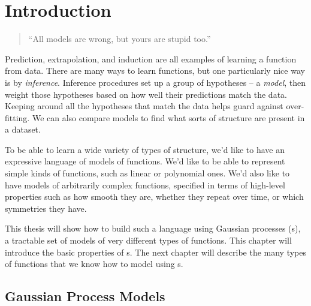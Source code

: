 
\inbpdocument

\chapter{Introduction}
\label{ch:intro}




\begin{quotation}
``All models are wrong, but yours are stupid too.'' \\
\hspace*{\fill} \citet{mlhipster}
\end{quotation}

Prediction, extrapolation, and induction are all examples of learning a function from data.
There are many ways to learn functions, but one particularly nice way is by \emph{inference}.
Inference procedures set up a group of hypotheses -- a \emph{model}, then weight those hypotheses based on how well their predictions match the data.
Keeping around all the hypotheses that match the data helps guard against over-fitting.
We can also compare models to find what sorts of structure are present in a dataset.

To be able to learn a wide variety of types of structure, we'd like to have an expressive language of models of functions.  We'd like to be able to represent simple kinds of functions, such as linear or polynomial ones.  We'd also like to have models of arbitrarily complex functions, specified in terms of high-level properties such as how smooth they are, whether they repeat over time, or which symmetries they have.

This thesis will show how to build such a language using Gaussian processes (\gp{}s), a tractable set of models of very different types of functions.
This chapter will introduce the basic properties of \gp{}s.
The next chapter will describe the many types of functions that we know how to model using \gp{}s.




\section{Gaussian Process Models}

